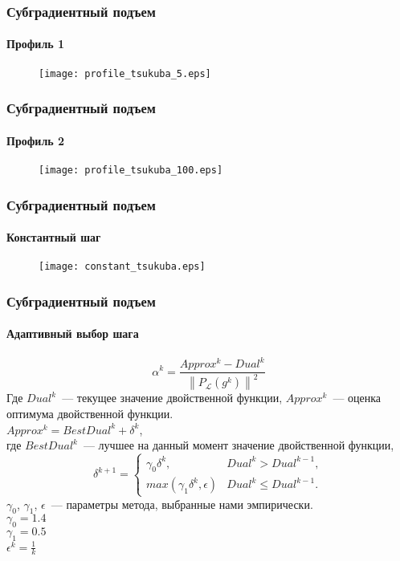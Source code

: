 \documentclass[smaller,unicode,hyperref={unicode=true}]{beamer}
\begin{document}
\begin{frame}
  \frametitle{Субградиентный подъем}
  \framesubtitle{Профиль 1}
    \begin{figure}
      \texttt{[image: profile\_tsukuba\_5.eps]}
    \end{figure}
\end{frame}

\begin{frame}
  \frametitle{Субградиентный подъем}
  \framesubtitle{Профиль 2}
    \begin{figure}
      \texttt{[image: profile\_tsukuba\_100.eps]}
    \end{figure}
\end{frame}

\begin{frame}
  \frametitle{Субградиентный подъем}
  \framesubtitle{Константный шаг}
    \begin{figure}
      \texttt{[image: constant\_tsukuba.eps]}
    \end{figure}
\end{frame}

\begin{frame}
  \frametitle{Субградиентный подъем}
  \framesubtitle{Адаптивный выбор шага}
    \begin{equation}
    \alpha^k = \frac{Approx^k - Dual^k}{\left \| P_{\mathcal{L}} ({g^k}) \right \|^2}
    \end{equation}
    Где $Dual^k$~--- текущее значение двойственной функции, 
    $Approx^k$~--- оценка оптимума двойственной функции.\\
    $Approx^k = BestDual^k + \delta^k$,\\
    где $BestDual^k$~--- лучшее на данный момент значение двойственной функции,\\
    \begin{equation}
        \delta^{k+1} = \begin{cases}
        \gamma_0 \delta^k, & Dual^k > Dual^{k-1},\\
        max(\gamma_1 \delta^k, \epsilon) & Dual^k \leqslant  Dual^{k-1}.
        \end{cases}
    \end{equation}
    $\gamma_0$, $\gamma_1$, $\epsilon$~--- параметры метода, выбранные нами эмпирически.\\
    $\gamma_0 = 1.4$\\
    $\gamma_1 = 0.5$\\
    $\epsilon^k = \frac{1}{k}$\\
\end{frame}
\end{document}
